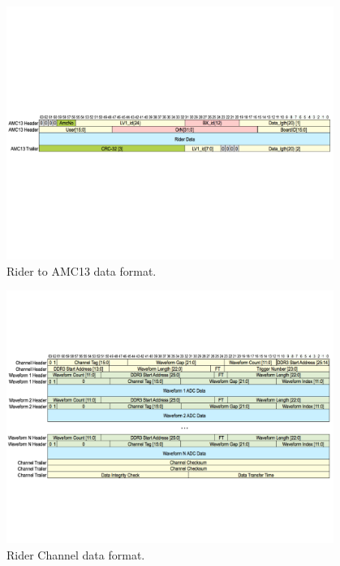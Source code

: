 \begin{figure}[htbp]
\centering
\includegraphics[trim=0cm 9.5cm 0cm 9.5cm ,width=0.95\textwidth]{pics/RiderToAMC13Header}
\caption{Rider to AMC13 data format.}
\end{figure}

\begin{figure}[htbp]
\centering
\includegraphics[trim=0cm 5.5cm 0cm 5.5cm ,width=0.95\textwidth]{pics/RiderChannelHeader}
\caption{Rider Channel data format.}
\end{figure}

